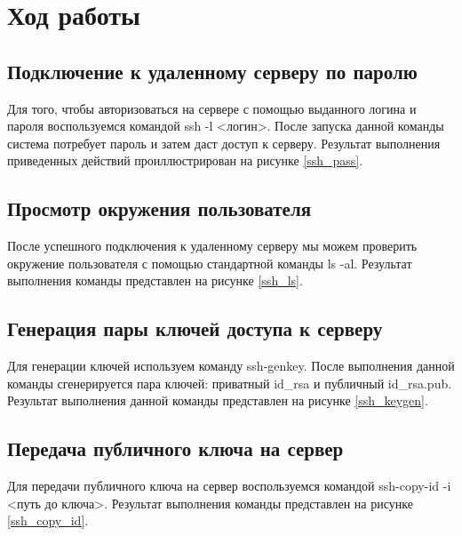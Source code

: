 \section{Ход работы}

\subsection{Подключение к удаленному серверу по паролю}

Для того, чтобы авторизоваться на сервере с помощью выданного логина и пароля воспользуемся командой ssh -l <логин>. После запуска данной команды система потребует пароль и затем даст доступ к серверу. Результат выполнения приведенных действий проиллюстрирован на рисунке \ref{ssh_pass}.


\subsection{Просмотр окружения пользователя}

После успешного подключения к удаленному серверу мы можем проверить окружение пользователя с помощью стандартной команды ls -al. Результат выполнения команды представлен на рисунке \ref{ssh_ls}.


\subsection{Генерация пары ключей доступа к серверу}

Для генерации ключей используем команду ssh-genkey. После выполнения данной команды сгенерируется пара ключей: приватный id\_rsa и публичный id\_rsa.pub. Результат выполнения данной команды представлен на рисунке \ref{ssh_keygen}.


\subsection{Передача публичного ключа на сервер}

Для передачи публичного ключа на сервер воспользуемся командой ssh-copy-id -i <путь до ключа>. Результат выполнения команды представлен на рисунке \ref{ssh_copy_id}.


